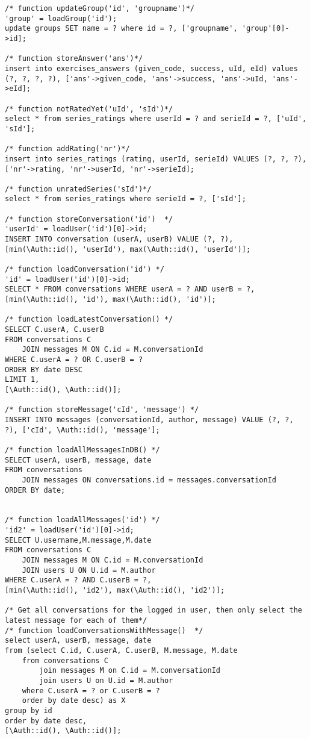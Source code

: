 \begin{lstlisting}
/* function updateGroup('id', 'groupname')*/
'group' = loadGroup('id');
update groups SET name = ? where id = ?, ['groupname', 'group'[0]->id];

/* function storeAnswer('ans')*/
insert into exercises_answers (given_code, success, uId, eId) values (?, ?, ?, ?), ['ans'->given_code, 'ans'->success, 'ans'->uId, 'ans'->eId];

/* function notRatedYet('uId', 'sId')*/
select * from series_ratings where userId = ? and serieId = ?, ['uId', 'sId'];

/* function addRating('nr')*/
insert into series_ratings (rating, userId, serieId) VALUES (?, ?, ?), ['nr'->rating, 'nr'->userId, 'nr'->serieId];

/* function unratedSeries('sId')*/
select * from series_ratings where serieId = ?, ['sId'];

/* function storeConversation('id')  */
'userId' = loadUser('id')[0]->id;
INSERT INTO conversation (userA, userB) VALUE (?, ?), [min(\Auth::id(), 'userId'), max(\Auth::id(), 'userId')];

/* function loadConversation('id') */
'id' = loadUser('id')[0]->id;
SELECT * FROM conversations WHERE userA = ? AND userB = ?, [min(\Auth::id(), 'id'), max(\Auth::id(), 'id')];

/* function loadLatestConversation() */
SELECT C.userA, C.userB
FROM conversations C
    JOIN messages M ON C.id = M.conversationId
WHERE C.userA = ? OR C.userB = ?
ORDER BY date DESC
LIMIT 1,
[\Auth::id(), \Auth::id()];

/* function storeMessage('cId', 'message') */
INSERT INTO messages (conversationId, author, message) VALUE (?, ?, ?), ['cId', \Auth::id(), 'message'];

/* function loadAllMessagesInDB() */
SELECT userA, userB, message, date
FROM conversations
    JOIN messages ON conversations.id = messages.conversationId
ORDER BY date;


/* function loadAllMessages('id') */
'id2' = loadUser('id')[0]->id;
SELECT U.username,M.message,M.date
FROM conversations C
    JOIN messages M ON C.id = M.conversationId
    JOIN users U ON U.id = M.author
WHERE C.userA = ? AND C.userB = ?,
[min(\Auth::id(), 'id2'), max(\Auth::id(), 'id2')];

/* Get all conversations for the logged in user, then only select the latest message for each of them*/
/* function loadConversationsWithMessage()  */
select userA, userB, message, date
from (select C.id, C.userA, C.userB, M.message, M.date
    from conversations C
        join messages M on C.id = M.conversationId
        join users U on U.id = M.author
    where C.userA = ? or C.userB = ?
    order by date desc) as X
group by id
order by date desc,
[\Auth::id(), \Auth::id()];
\end{lstlisting}
